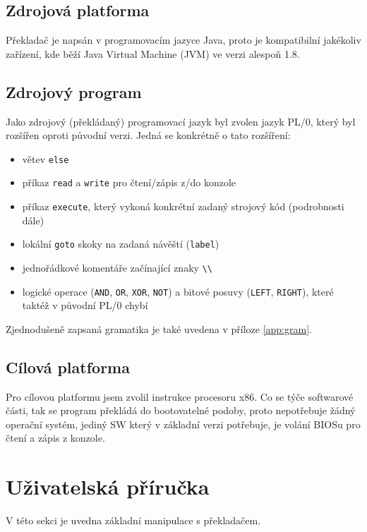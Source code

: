 \documentclass[a4paper]{article}
\begin{document}
\subsection{Zdrojov\'a platforma}
P\v{r}eklada\v{c} je naps\'an v programovac\'im jazyce Java, proto je
kompatibiln\'i jak\'eko\-liv za\v{r}\'izen\'i, kde b\v{e}\v{z}\'i Java
Virtual Machine (JVM) ve verzi alespo\v{n} 1.8.
\subsection{Zdrojov\'y program}
Jako zdrojov\'y (p\v{r}ekl\'adan\'y) programovac\'i jazyk byl zvolen jazyk
PL/0, kter\'y byl roz\v{s}\'i\v{r}en oproti p\r{u}vodn\'i verzi.
Jedn\'a se konkr\'etn\v{e} o tato roz\v{s}\'i\v{r}en\'i:

\begin{itemize}
\item v\v{e}tev \texttt{else}
\item p\v{r}\'ikaz \texttt{read} a \texttt{write} pro \v{c}ten\'i/z\'apis z/do
	konzole
\item p\v{r}\'ikaz \texttt{execute}, kter\'y vykon\'a konkr\'etn\'i
	zadan\'y strojov\'y k\'od (podrobnosti d\'ale)
\item lok\'aln\'i \texttt{goto} skoky na zadan\'a n\'av\v{e}\v{s}t\'i
	(\texttt{label})
\item jedno\v{r}\'adkov\'e koment\'a\v{r}e za\v{c}\'inaj\'ic\'i znaky
	\texttt{\textbackslash\textbackslash}
\item logick\'e operace (\texttt{AND}, \texttt{OR}, \texttt{XOR}, \texttt{NOT})
	a bitov\'e posuvy (\texttt{LEFT}, \texttt{RIGHT}), kter\'e takt\'e\v{z}
	v p\r{u}vodn\'i PL/0 chyb\'i
\end{itemize}

\noindent
Zjednodu\v{s}en\v{e} zapsan\'a gramatika je tak\'e uvedena v p\v{r}\'iloze
\ref{app:gram}.
\subsection{C\'ilov\'a platforma}
Pro c\'ilovou platformu jsem zvolil instrukce procesoru x86. Co se t\'y\v{c}e
softwarov\'e \v{c}\'asti, tak se program p\v{r}ekl\'ad\'a do bootovateln\'e
podoby, proto nepot\v{r}ebuje \v{z}\'adn\'y opera\v{c}n\'i syst\'em, jedin\'y
SW kter\'y v z\'akladn\'i verzi pot\v{r}ebuje, je vol\'an\'i BIOSu pro
\v{c}ten\'i a z\'apis z konzole.
\clearpage
\section{U\v{z}ivatelsk\'a p\v{r}\'iru\v{c}ka}\label{sec:uziv}
V t\'eto sekci je uvedna z\'akladn\'i manipulace s p\v{r}eklada\v{c}em.
\end{document}

